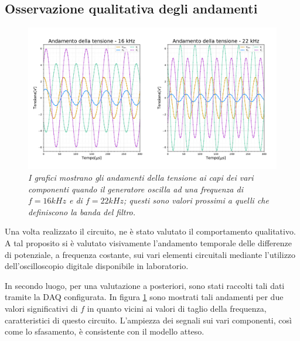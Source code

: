 \subsection{Osservazione qualitativa degli andamenti}

\begin{figure}[h!]
    \centering
    \includegraphics[width=1\textwidth]{../figs/tensione-tempo.pdf}
    \caption{\emph{I grafici mostrano gli andamenti della tensione ai capi dei vari componenti quando il generatore
    oscilla ad una frequenza di $f=16kHz$ e di $f=22kHz$; questi sono valori prossimi a quelli che definiscono la banda del filtro.}}
    \label{fig:tensione-tempo}
\end{figure}


Una volta realizzato il circuito, ne è stato valutato il comportamento qualitativo. A tal proposito si è valutato visivamente
l'andamento temporale delle differenze di potenziale, a frequenza costante, sui vari elementi circuitali mediante
l'utilizzo dell'oscilloscopio digitale disponibile in laboratorio.

In secondo luogo, per una valutazione a posteriori, sono stati raccolti tali dati tramite la DAQ configurata.
In figura \ref{fig:tensione-tempo} sono mostrati tali andamenti per due valori significativi di $f$ in quanto vicini ai
valori di taglio della frequenza, caratteristici di questo circuito.
L'ampiezza dei segnali sui vari componenti, così come lo sfasamento, è consistente con il modello atteso.


